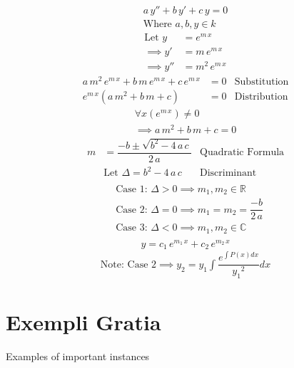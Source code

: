 \documentclass{article}
\begin{document}
	\begin{gather*}
		a\,y''+b\,y'+c\,y=0\\
		\text{Where } a,b,y\in k
	\end{gather*}
	\begin{align*}
		\text{Let }y&=e^{m\,x}\\
		\implies y'&=m\,e^{m\,x}\\
		\implies y''&=m^2\,e^{m\,x}
	\end{align*}
	\begin{align*}
		a\,m^2\,e^{m\,x}+b\,m\,e^{m\,x}+c\,e^{m\,x}&=0 &\text{Substitution}\\
		e^{m\,x}(a\,m^2+b\,m+c)&=0 &\text{Distribution}
	\end{align*}
	\begin{gather*}
		\forall x(e^{m\,x})\neq 0\\
		\implies a\,m^2+b\,m+c=0
	\end{gather*}
	\begin{align*}
		m&=\dfrac{-b\pm\sqrt{b^2-4\,a\,c}}{2\,a} &\text{Quadratic Formula}\\
		&\text{Let }\Delta=b^2-4\,a\,c &\text{Discriminant}\\
	\end{align*}
	\begin{align*}
		&\text{Case 1: }\Delta>0\implies m_1,m_2\in \mathbb{R}\\
		&\text{Case 2: }\Delta=0\implies m_1=m_2=\dfrac{-b}{2\,a}\\
		&\text{Case 3: }\Delta<0\implies m_1,m_2\in \mathbb{C}\\
	\end{align*}
	\begin{equation*}
		y=c_1\,e^{m_1\,x}+c_2\,e^{m_2\,x}
	\end{equation*}
	\begin{gather*}
		\text{Note: Case 2}\implies y_2=y_1\int{\dfrac{e^{\int{P(x)dx}}}{{y_1}^2}dx}
	\end{gather*}

\section{Exempli Gratia}

Examples of important instances
\end{document}
